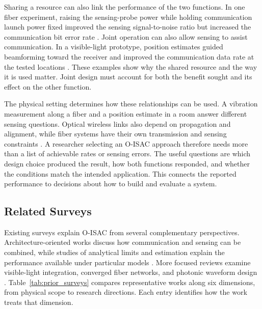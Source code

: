 Sharing a resource can also link the performance of the two functions.
In one fiber experiment, raising the sensing-probe power while holding
communication launch power fixed improved the sensing signal-to-noise ratio
but increased the communication bit error rate \cite{OISAC_SCR00057}.
Joint operation can also allow sensing to assist communication. In a
visible-light prototype, position estimates guided beamforming toward the
receiver and improved the communication data rate at the tested locations
\cite{OISAC_SCR00196}. These examples show why the shared resource and the way
it is used matter. Joint design must account for both the benefit sought and
its effect on the other function.

The physical setting determines how these relationships can be used.
A vibration measurement along a fiber and a position estimate in a room
answer different sensing questions. Optical wireless links also depend on
propagation and alignment, while fiber systems have their own transmission
and sensing constraints \cite{OISAC_SCR00916,OISAC_SCR01085,Mohsan2026OISACReview}.
A researcher selecting an O-ISAC approach therefore needs more than a list
of achievable rates or sensing errors. The useful questions are which design
choice produced the result, how both functions responded, and whether the
conditions match the intended application. This connects the reported
performance to decisions about how to build and evaluate a system.

\subsection{Related Surveys}
\label{sec:related_surveys}

Existing surveys explain O-ISAC from several complementary perspectives.
Architecture-oriented works discuss how communication and sensing can be
combined, while studies of analytical limits and estimation explain the
performance available under particular models
\cite{Wen2024OISACArchitectures,Su2025OISACTheoryPractice,
Khorasgani2026GeneralOpticalISACSurvey}. More focused reviews examine
visible-light integration, converged fiber networks, and photonic waveform
design \cite{Liang2024LiSACReview,Liu2026OpticalFiberISACReview,
Lu2026ConvergedFiberISACReview,Lyu2026PhotonicTHzWaveforms}.
Table~\ref{tab:prior_surveys} compares representative works along six dimensions,
from physical scope to research directions. Each entry identifies how the
work treats that dimension.

